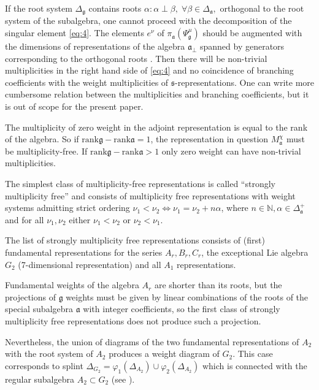 \documentclass[12pt]{article}
\newcommand{\pia}{\pi_{\mathfrak{a}}}
\newcommand{\gf}{\mathfrak{g}}
\newcommand{\af}{\mathfrak{a}}
\newcommand{\afb}{\mathfrak{a}_{\bot}}
\newcommand{\sfr}{\mathfrak{s}}
\begin{document}
If the root system $\Delta_{\gf}$ contains roots $\alpha: \alpha\perp \beta,\; \forall \beta\in
\Delta_{\af},$ orthogonal to the root system of the subalgebra, one cannot proceed with the decomposition
of the singular element \ref{eq:4}. The elements $e^{\nu}$ of $\pia\left(\Psi^{\mu}_{\gf}\right)$
should be augmented with the dimensions of representations of the algebra $\afb$ spanned by generators
corresponding to the orthogonal roots \cite{2010arXiv1007.0318L}. Then there will be non-trivial
multiplicities in the right hand side of \ref{eq:4} and no coincidence of branching coefficients
with the weight multiplicities of $\sfr$-representations. One can write more cumbersome relation between
the multiplicities and branching coefficients, but it is out of scope for the present paper.

The multiplicity of zero weight in the adjoint representation is equal to the rank of the algebra. So if
$\mathrm{rank}\gf-\mathrm{rank}\af=1$, the representation in question $M^{\chi}_{\af}$ must be
multiplicity-free. If $\mathrm{rank}\gf-\mathrm{rank}\af>1$ only zero weight can have non-trivial
multiplicities. 

The simplest class of multiplicity-free representations is called ``strongly multiplicity free''
\cite{lehrer2006strongly} and consists of multiplicity free representations with weight systems
admitting strict ordering $\nu_{1}<\nu_{2} \Leftrightarrow \nu_{1}=\nu_{2}+n \alpha$, where $n\in
\mathbb{N}, \alpha\in \Delta^{+}_{\af}$ and for all $\nu_{1},\nu_{2}$ either $\nu_{1}<\nu_{2}$ or
$\nu_{2}<\nu_{1}$.

The list of strongly multiplicity free representations consists of (first) fundamental representations
for the series $A_{r}, B_{r}, C_{r}$, the exceptional Lie algebra $G_{2}$ (7-dimensional representation) and
all $A_{1}$ representations. 

Fundamental weights of the algebra $A_{r}$ are shorter than its roots, but the projections of $\gf$
weights must be given by linear combinations of the roots of the  special subalgebra $\af$ with integer
coefficients, so the first class of strongly multiplicity free representations does not produce such a
projection. 

Nevertheless, the union of diagrams of the two fundamental representations of $A_{2}$ with the root
system of $A_{2}$ produces a weight diagram of $G_{2}$. This case corresponds to splint
$\Delta_{G_{2}}=\varphi_{1}( \Delta_{A_{2}})\cup \varphi_{2}(\Delta_{A_{2}})$ which is connected
with the regular subalgebra $A_{2}\subset G_{2}$ (see \cite{2011arXiv1111.6787L}).
\end{document}
